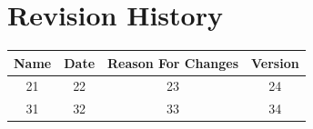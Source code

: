 
\chapter*{Revision History}

\begin{center}
    \begin{tabular}{|c|c|c|c|}
        \hline
	    Name & Date & Reason For Changes & Version\\
        \hline
	    21 & 22 & 23 & 24\\
        \hline
	    31 & 32 & 33 & 34\\
        \hline
    \end{tabular}
\end{center}